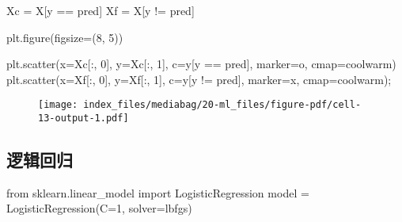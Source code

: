 \documentclass[
  letterpaper,
  DIV=11,
  numbers=noendperiod]{scrreprt}
\newenvironment{Shaded}{\begin{snugshade}}{\end{snugshade}}
\newcommand{\DecValTok}[1]{\textcolor[rgb]{0.68,0.00,0.00}{#1}}
\newcommand{\ImportTok}[1]{\textcolor[rgb]{0.00,0.46,0.62}{#1}}
\newcommand{\NormalTok}[1]{\textcolor[rgb]{0.00,0.23,0.31}{#1}}
\newcommand{\OperatorTok}[1]{\textcolor[rgb]{0.37,0.37,0.37}{#1}}
\newcommand{\StringTok}[1]{\textcolor[rgb]{0.13,0.47,0.30}{#1}}
\begin{document}
\begin{Shaded}
\begin{Highlighting}[]
\NormalTok{Xc }\OperatorTok{=}\NormalTok{ X[y }\OperatorTok{==}\NormalTok{ pred]}
\NormalTok{Xf }\OperatorTok{=}\NormalTok{ X[y }\OperatorTok{!=}\NormalTok{ pred]}

\NormalTok{plt.figure(figsize}\OperatorTok{=}\NormalTok{(}\DecValTok{8}\NormalTok{, }\DecValTok{5}\NormalTok{))}

\NormalTok{plt.scatter(x}\OperatorTok{=}\NormalTok{Xc[:, }\DecValTok{0}\NormalTok{], y}\OperatorTok{=}\NormalTok{Xc[:, }\DecValTok{1}\NormalTok{], c}\OperatorTok{=}\NormalTok{y[y }\OperatorTok{==}\NormalTok{ pred],}
\NormalTok{            marker}\OperatorTok{=}\StringTok{\textquotesingle{}o\textquotesingle{}}\NormalTok{, cmap}\OperatorTok{=}\StringTok{\textquotesingle{}coolwarm\textquotesingle{}}\NormalTok{)}
\NormalTok{plt.scatter(x}\OperatorTok{=}\NormalTok{Xf[:, }\DecValTok{0}\NormalTok{], y}\OperatorTok{=}\NormalTok{Xf[:, }\DecValTok{1}\NormalTok{], c}\OperatorTok{=}\NormalTok{y[y }\OperatorTok{!=}\NormalTok{ pred],}
\NormalTok{            marker}\OperatorTok{=}\StringTok{\textquotesingle{}x\textquotesingle{}}\NormalTok{, cmap}\OperatorTok{=}\StringTok{\textquotesingle{}coolwarm\textquotesingle{}}\NormalTok{)}\OperatorTok{;}
\end{Highlighting}
\end{Shaded}

\begin{figure}[H]

{\centering \texttt{[image: index\_files/mediabag/20-ml\_files/figure-pdf/cell-13-output-1.pdf]}

}

\end{figure}

\hypertarget{ux903bux8f91ux56deux5f52}{%
\subsection{逻辑回归}\label{ux903bux8f91ux56deux5f52}}

\begin{Shaded}
\begin{Highlighting}[]
\ImportTok{from}\NormalTok{ sklearn.linear\_model }\ImportTok{import}\NormalTok{ LogisticRegression}
\NormalTok{model }\OperatorTok{=}\NormalTok{ LogisticRegression(C}\OperatorTok{=}\DecValTok{1}\NormalTok{, solver}\OperatorTok{=}\StringTok{\textquotesingle{}lbfgs\textquotesingle{}}\NormalTok{) }
\end{Highlighting}
\end{Shaded}
\end{document}
